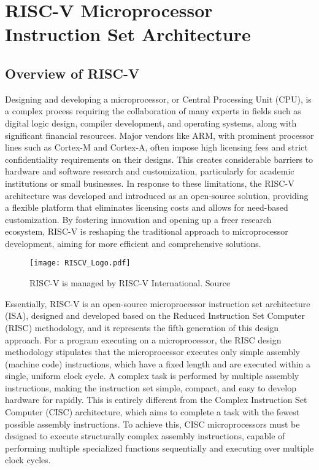 \chapter{RISC-V Microprocessor Instruction Set Architecture}

\section{Overview of RISC-V}

Designing and developing a microprocessor, or Central Processing Unit (CPU), is a complex process requiring the collaboration of many experts in fields such as digital logic design, compiler development, and operating systems, along with significant financial resources. Major vendors like ARM, with prominent processor lines such as Cortex-M and Cortex-A, often impose high licensing fees and strict confidentiality requirements on their designs. This creates considerable barriers to hardware and software research and customization, particularly for academic institutions or small businesses. In response to these limitations, the RISC-V architecture \cite{waterman2014riscv, waterman2015riscvprivileged} was developed and introduced as an open-source solution, providing a flexible platform that eliminates licensing costs and allows for need-based customization. By fostering innovation and opening up a freer research ecosystem, RISC-V is reshaping the traditional approach to microprocessor development, aiming for more efficient and comprehensive solutions.

\begin{figure}[h!]
    \centering
    \texttt{[image: RISCV\_Logo.pdf]}
    \caption{RISC-V is managed by RISC-V International. Source \cite{riscv2024members}}
    \label{fig:riscv_international}
\end{figure}

Essentially, RISC-V is an open-source microprocessor instruction set architecture (ISA), designed and developed based on the Reduced Instruction Set Computer (RISC) methodology, and it represents the fifth generation of this design approach. For a program executing on a microprocessor, the RISC design methodology stipulates that the microprocessor executes only simple assembly (machine code) instructions, which have a fixed length and are executed within a single, uniform clock cycle. A complex task is performed by multiple assembly instructions, making the instruction set simple, compact, and easy to develop hardware for rapidly. This is entirely different from the Complex Instruction Set Computer (CISC) architecture, which aims to complete a task with the fewest possible assembly instructions. To achieve this, CISC microprocessors must be designed to execute structurally complex assembly instructions, capable of performing multiple specialized functions sequentially and executing over multiple clock cycles.

